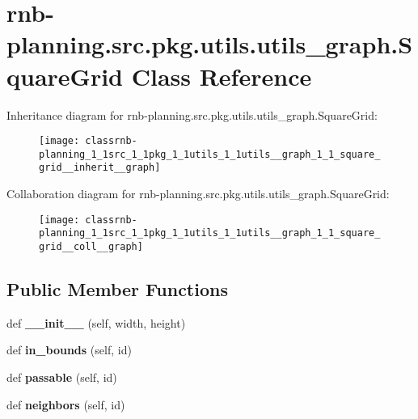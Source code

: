 \hypertarget{classrnb-planning_1_1src_1_1pkg_1_1utils_1_1utils__graph_1_1_square_grid}{}\section{rnb-\/planning.src.\+pkg.\+utils.\+utils\+\_\+graph.\+Square\+Grid Class Reference}
\label{classrnb-planning_1_1src_1_1pkg_1_1utils_1_1utils__graph_1_1_square_grid}


Inheritance diagram for rnb-\/planning.src.\+pkg.\+utils.\+utils\+\_\+graph.\+Square\+Grid\+:
\nopagebreak
\begin{figure}[H]
\begin{center}
\leavevmode
\texttt{[image: classrnb-planning\_1\_1src\_1\_1pkg\_1\_1utils\_1\_1utils\_\_graph\_1\_1\_square\_grid\_\_inherit\_\_graph]}
\end{center}
\end{figure}


Collaboration diagram for rnb-\/planning.src.\+pkg.\+utils.\+utils\+\_\+graph.\+Square\+Grid\+:
\nopagebreak
\begin{figure}[H]
\begin{center}
\leavevmode
\texttt{[image: classrnb-planning\_1\_1src\_1\_1pkg\_1\_1utils\_1\_1utils\_\_graph\_1\_1\_square\_grid\_\_coll\_\_graph]}
\end{center}
\end{figure}
\subsection*{Public Member Functions}
\begin{DoxyCompactItemize}
\item 
\mbox{\label{classrnb-planning_1_1src_1_1pkg_1_1utils_1_1utils__graph_1_1_square_grid_ac127f469ece4f5546c204deee7070bce}} 
def {\bfseries \+\_\+\+\_\+init\+\_\+\+\_\+} (self, width, height)
\item 
\mbox{\label{classrnb-planning_1_1src_1_1pkg_1_1utils_1_1utils__graph_1_1_square_grid_a868a04ae8a48050a99140e45a729fa56}} 
def {\bfseries in\+\_\+bounds} (self, id)
\item 
\mbox{\label{classrnb-planning_1_1src_1_1pkg_1_1utils_1_1utils__graph_1_1_square_grid_a02c45dd5ad0128d2ac5482846781cc36}} 
def {\bfseries passable} (self, id)
\item 
\mbox{\label{classrnb-planning_1_1src_1_1pkg_1_1utils_1_1utils__graph_1_1_square_grid_a21e9e5adfebd0ea74b7b353d54514531}} 
def {\bfseries neighbors} (self, id)
\end{DoxyCompactItemize}

